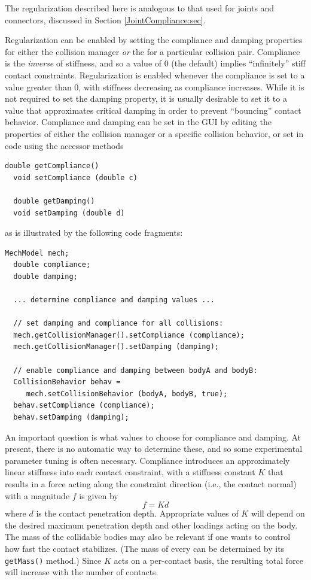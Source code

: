 \begin{sideblock}
The regularization described here is analogous to that used for joints
and connectors, discussed in Section \ref{JointCompliance:sec}.
\end{sideblock}

Regularization can be enabled by setting the {\sf compliance} and {\sf
damping} properties for either the collision manager {\it or} the
 for a
particular collision pair. Compliance is the {\it inverse} of
stiffness, and so a value of 0 (the default) implies ``infinitely''
stiff contact constraints. Regularization is enabled whenever the
compliance is set to a value greater than 0, with stiffness decreasing
as compliance increases. While it is not required to set the damping
property, it is usually desirable to set it to a value that
approximates critical damping in order to prevent ``bouncing'' contact
behavior. Compliance and damping can be set in the GUI by editing the
properties of either the collision manager or a specific collision
behavior, or set in code using the accessor methods
%
\begin{lstlisting}[]
  double getCompliance()
  void setCompliance (double c)

  double getDamping()
  void setDamping (double d)
\end{lstlisting}
%
as is illustrated by the following code fragments:
%
\begin{lstlisting}[]
  MechModel mech;
  double compliance;
  double damping;

  ... determine compliance and damping values ...

  // set damping and compliance for all collisions:
  mech.getCollisionManager().setCompliance (compliance);
  mech.getCollisionManager().setDamping (damping);

  // enable compliance and damping between bodyA and bodyB:
  CollisionBehavior behav = 
     mech.setCollisionBehavior (bodyA, bodyB, true);
  behav.setCompliance (compliance);
  behav.setDamping (damping);
\end{lstlisting}
%

An important question is what values to choose for compliance and
damping. At present, there is no automatic way to determine these, and
so some experimental parameter tuning is often necessary.  Compliance
introduces an approximately linear stiffness into each contact
constraint, with a stiffness constant $K$ that results in a force
acting along the constraint direction (i.e., the contact normal) with
a magnitude $f$ is given by
%
\begin{equation}
f = K d
\end{equation}
%
where $d$ is the contact penetration depth. Appropriate values of $K$
will depend on the desired maximum penetration depth and other
loadings acting on the body. The mass of the collidable bodies may
also be relevant if one wants to control how fast the contact
stabilizes. (The mass of every
 can be
determined by its {\tt getMass()} method.)  Since $K$ acts on a
per-contact basis, the resulting total force will increase with the
number of contacts.

